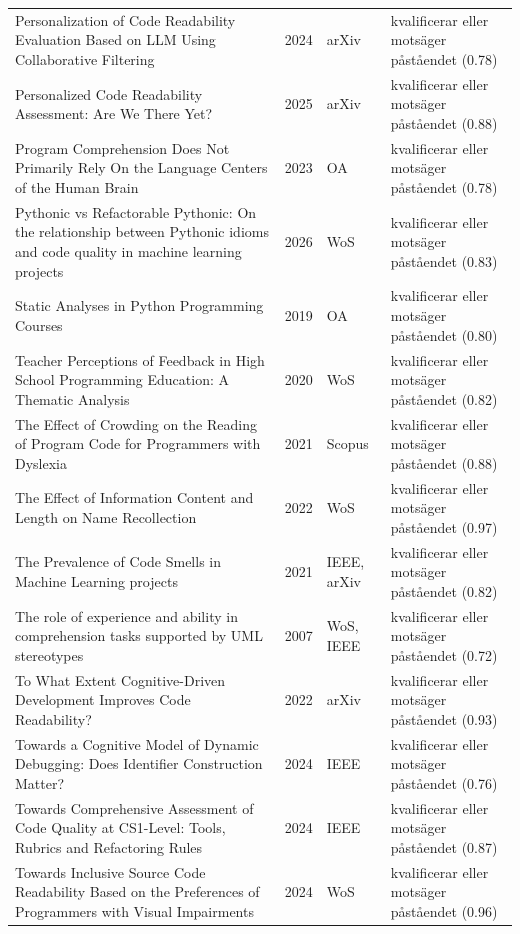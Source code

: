 \begin{longtable}{@{}%
  >{\raggedright\arraybackslash}p{}c%
  >{\raggedright\arraybackslash}p{}%
  >{\raggedright\arraybackslash}p{}@{}}
Personalization of Code Readability Evaluation Based on LLM Using Collaborative Filtering & 2024 & arXiv & kvalificerar eller motsäger påståendet (0.78) \\
Personalized Code Readability Assessment: Are We There Yet? & 2025 & arXiv & kvalificerar eller motsäger påståendet (0.88) \\
Program Comprehension Does Not Primarily Rely On the Language Centers of the Human Brain & 2023 & OA & kvalificerar eller motsäger påståendet (0.78) \\
Pythonic vs Refactorable Pythonic: On the relationship between Pythonic idioms and code quality in machine learning projects & 2026 & WoS & kvalificerar eller motsäger påståendet (0.83) \\
Static Analyses in Python Programming Courses & 2019 & OA & kvalificerar eller motsäger påståendet (0.80) \\
Teacher Perceptions of Feedback in High School Programming Education: A Thematic Analysis & 2020 & WoS & kvalificerar eller motsäger påståendet (0.82) \\
The Effect of Crowding on the Reading of Program Code for Programmers with Dyslexia & 2021 & Scopus & kvalificerar eller motsäger påståendet (0.88) \\
The Effect of Information Content and Length on Name Recollection & 2022 & WoS & kvalificerar eller motsäger påståendet (0.97) \\
The Prevalence of Code Smells in Machine Learning projects & 2021 & IEEE, arXiv & kvalificerar eller motsäger påståendet (0.82) \\
The role of experience and ability in comprehension tasks supported by UML stereotypes & 2007 & WoS, IEEE & kvalificerar eller motsäger påståendet (0.72) \\
To What Extent Cognitive-Driven Development Improves Code Readability? & 2022 & arXiv & kvalificerar eller motsäger påståendet (0.93) \\
Towards a Cognitive Model of Dynamic Debugging: Does Identifier Construction Matter? & 2024 & IEEE & kvalificerar eller motsäger påståendet (0.76) \\
Towards Comprehensive Assessment of Code Quality at CS1-Level: Tools, Rubrics and Refactoring Rules & 2024 & IEEE & kvalificerar eller motsäger påståendet (0.87) \\
Towards Inclusive Source Code Readability Based on the Preferences of Programmers with Visual Impairments & 2024 & WoS & kvalificerar eller motsäger påståendet (0.96) \\

\end{longtable}
